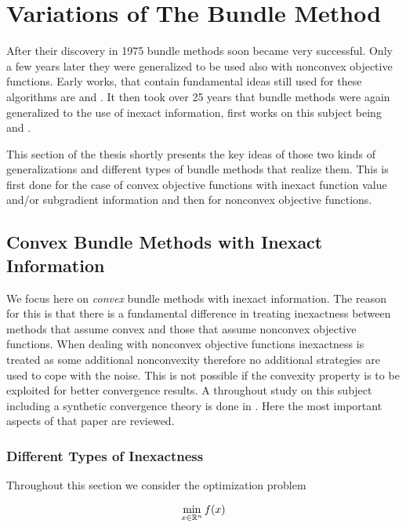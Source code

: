\section{Variations of The Bundle Method}

After their discovery in 1975 bundle methods soon became very successful. Only a few years later they were generalized to be used also with nonconvex objective functions. Early works, that contain fundamental ideas still used for these algorithms are \cite{Mifflin1982} and \cite{Kiwiel1985}.
It then took over 25 years that bundle methods were again generalized to the use of inexact information, first works on this subject being \cite{Hintermueller2001,Kiwiel2006} and \cite{Solodov2003}.

This section of the thesis shortly presents the key ideas of those two kinds of generalizations and different types of bundle methods that realize them.
This is first done for the case of convex objective functions with inexact function value and/or subgradient information and then for nonconvex objective functions. 

\subsection{Convex Bundle Methods with Inexact Information}

We focus here on \emph{convex} bundle methods with inexact information. The reason for this is that there is a fundamental difference in treating inexactness between methods that assume convex and those that assume nonconvex objective functions.
When dealing with nonconvex objective functions inexactness is treated as some additional nonconvexity therefore no additional strategies are used to cope with the noise. This is not possible if the convexity property is to be exploited for better convergence results.
A throughout study on this subject including a synthetic convergence theory is done in \cite{Oliveira2014}. Here the most important aspects %
of that paper are reviewed.

\subsubsection{Different Types of Inexactness}

Throughout this section we consider the optimization problem

\begin{equation}
	\min_{x \in \mathbb{R}^n} f(x)
\label{opt_prob_conv}
\end{equation}

